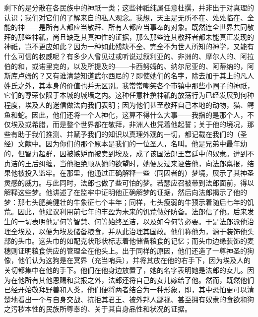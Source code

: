 剩下的是分散在各民族中的神祇一类；这些神祇纯属任意杜撰，并非出于对真理的认识；我们对它们的了解来自的私人观念。我想，天主是无所不在、处处临在、全能的神——是所有人都应当敬拜、所有人都应当事奉的对象。既然连全世界共同敬拜的那些神祇，尚且缺乏其真神性的证据，那么那些连其敬拜者都未能真正发现的神祇，岂不更应如此？因为一种如此残缺不全、完全不为世人所知的神学，又能有什么可信的权威呢？有多少人曾见过或听说过叙利亚的、非洲的、摩尔人的、阿拉伯的和，或诺里克的，以及所提及的——卡西努姆的、纳尔尼亚的、阿蒂纳的，阿斯库卢姆的？又有谁清楚知道武尔西尼的？即使她们的名字，除去加于其上的凡人姓氏之外，其本身的价值也并无区别。我常常嘲笑各个市镇中那些小圈子的神祇，它们的尊荣仅限于本城的城墙之内。这种任意杜撰神祇的放荡行为已经发展到何种程度，埃及人的迷信做法向我们表明；因为他们甚至敬拜自己本地的动物，猫、鳄鱼和蛇。因此，他们还将一个人神化，这算不得什么大事——我指的是那个人，不仅埃及或希腊，而是整个世界都在敬拜，非洲人也凭着他起誓；关于他的境况，那些有助于我们推测、并赋予我们的知识以真理外观的一切，都记载在我们的（圣经）文献中。因为你们的那个原本是我们的一位圣人，名叫。他是兄弟中最年幼的，但智力超群，因被嫉妒而被卖到埃及，成了该国法郎王宫廷中的奴隶。遭到不贞洁的王后纠缠，当他拒绝顺从她的欲望时，她便反过来诬告他，向法郎禀报，结果他被投入监牢。在那里，他通过正确解释一些（同囚者的）梦境，展示了其神圣灵感的威力。与此同时，法郎也做了些可怕的梦。若瑟应召被带到法郎面前，得以解释这些梦。他讲述了在监牢中证明他正确解梦的证据，然后向法郎揭示了他的梦：那七头肥美健壮的牛象征七个丰年；同样，七头瘦弱的牛预示着随后七年的饥荒。因此，他建议利用前七年的丰盈为未来的饥荒做好防备。法郎信了他。后来发生的一切表明他是何等智慧、何等始终圣洁，以及如今何等必要。于是法郎派他治理全埃及，以便为埃及储备粮食，并从此治理其国政。他们称他为，源于装饰他头部的头巾。这头巾的如配克状形状标志着他储备粮食的记忆；而头巾边缘装饰的麦穗则证明粮食供应的管理全在他头上。出于同样的原因，他们还造了一尊神圣的狗像，他们认为这狗是在冥界（充当哨兵），并将其放在他的右手下，因为埃及人的关切都集中在他的手下。他们在他身边放置了，她的名字表明她是法郎的女儿。因为在他所有其他恩赐和赏报之外，法郎还将自己的女儿嫁给了他。然而，既然他们已经开始敬拜野兽和人类，他们便将两者结合为一种形象，即，其中恐怕更可以清楚地看出一个与自身交战、抗拒其君王、被外邦人鄙视、甚至拥有奴隶的食欲和狗之污秽本性的民族所尊奉的、关于其自身品性和状况的证据。\par

